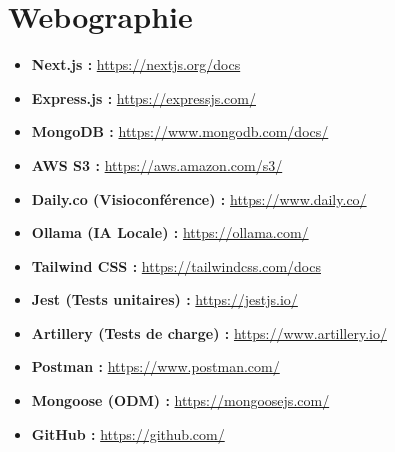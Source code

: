\documentclass[12pt,a4paper]{report}
\begin{document}


\clearpage

\clearpage

\clearpage

{}
\tableofcontents
\clearpage

{}
\listoffigures
\clearpage

{}
\listoftables
\clearpage










\newpage
{}
{}
\nocite{*}



\chapter*{Webographie}
\begin{itemize}
    \item \textbf{Next.js :} \url{https://nextjs.org/docs}
    \item \textbf{Express.js :} \url{https://expressjs.com/}
    \item \textbf{MongoDB :} \url{https://www.mongodb.com/docs/}
    \item \textbf{AWS S3 :} \url{https://aws.amazon.com/s3/}
    \item \textbf{Daily.co (Visioconférence) :} \url{https://www.daily.co/}
    \item \textbf{Ollama (IA Locale) :} \url{https://ollama.com/}
    \item \textbf{Tailwind CSS :} \url{https://tailwindcss.com/docs}
    \item \textbf{Jest (Tests unitaires) :} \url{https://jestjs.io/}
    \item \textbf{Artillery (Tests de charge) :} \url{https://www.artillery.io/}
    \item \textbf{Postman :} \url{https://www.postman.com/}
    \item \textbf{Mongoose (ODM) :} \url{https://mongoosejs.com/}
    \item \textbf{GitHub :} \url{https://github.com/}
\end{itemize}
\end{document}
